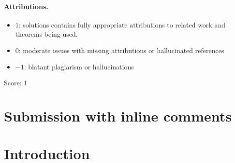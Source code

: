 \documentclass[11pt]{article}
\newcommand{\gp}{\mathrm{gp}}
\newcommand{\R}{\mathrm R}
\theoremstyle{definition}
\theoremstyle{remark}
\begin{document}
\paragraph{Attributions.}
\begin{itemize}
	\item  1: solutions contains fully appropriate attributions
		to related work and theorems being used.
	\item  0: moderate issues with missing attributions or hallucinated references
	\item  $-1$: blatant plagiarism or hallucinations
\end{itemize}

\noindent Score: 1

\newpage
\section{Submission with inline comments}


\begin{abstract}
Let \(P\) be an integral, saturated, sharp commutative monoid, let \(A_P\) be
the category of monoids under \(P\), equipped with the birhizomic topology on
\(A_P^{\mathrm{op}}\), and let \(B_P\subset A_P\) be the full subcategory of
the sharpened localizations \(P\to P[-x]^\sharp\), \(x\in P\), with the
trivial topology (all definitions are recalled in \S1).  The inclusion
induces an inverse image functor \(\pi^{-1}\) from presheaves on
\(B_P^{\mathrm{op}}\) to birhizomic sheaves, with right adjoint \(\pi_*\),
and the question answered here asks whether \(F\to\R\pi_*\pi^{-1}F\) is a
quasi-isomorphism for every presheaf of abelian groups \(F\) on
\(B_P^{\mathrm{op}}\).  We show that it is, for every \(P\), with no
finiteness hypothesis.  The proof replaces the birhizomic topology by a
finer auxiliary topology generated by binary ``sign covers''
\(\{R\to R\langle x\rangle,\ R\to R\langle -x\rangle\}\), where
\(R\langle \pm x\rangle\) is the universal monoid under \(R\) in which
\(\pm x\in R^{\gp}\) becomes nonnegative; a compactness argument shows that
every birhizomic cover is a cover for it, and the left Kan extension of
\(F\) turns out to be a sheaf for it with split exact Mayer--Vietoris
sequences, hence acyclic by an induction on the degree.  Acyclicity then
descends to the coarser birhizomic topology.
\end{abstract}

\section{Introduction}
\end{document}
